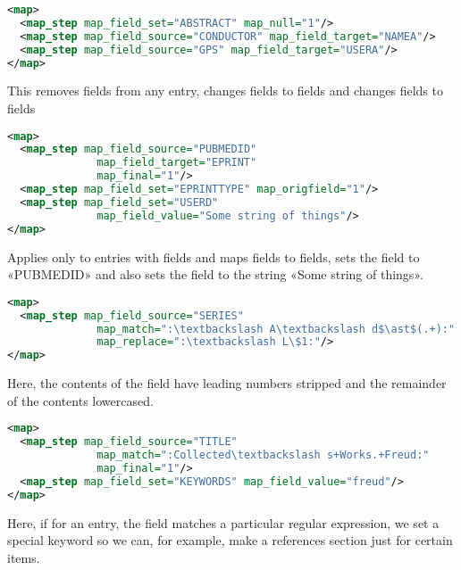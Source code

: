 \documentclass{ltxdockit}
\begin{document}
\begin{lstlisting}[language=xml,escapechar=:,mathescape=true]
<map>
  <map_step map_field_set="ABSTRACT" map_null="1"/>
  <map_step map_field_source="CONDUCTOR" map_field_target="NAMEA"/>
  <map_step map_field_source="GPS" map_field_target="USERA"/>
</map>
\end{lstlisting}

\noindent This removes  fields from any entry, changes
 fields to  fields and changes 
fields to  fields

\begin{lstlisting}[language=xml,escapechar=:,mathescape=true]
<map>
  <map_step map_field_source="PUBMEDID"
              map_field_target="EPRINT"
              map_final="1"/>
  <map_step map_field_set="EPRINTTYPE" map_origfield="1"/>
  <map_step map_field_set="USERD"
              map_field_value="Some string of things"/>
</map>
\end{lstlisting}

\noindent Applies only to entries with  fields and maps
 fields to  fields, sets the 
field to «PUBMEDID» and also sets the  field to the string
«Some string of things».

\begin{lstlisting}[language=xml,escapechar=:,mathescape=true]
<map>
  <map_step map_field_source="SERIES"
              map_match=":\textbackslash A\textbackslash d$\ast$(.+):"
              map_replace=":\textbackslash L\$1:"/>
</map>
\end{lstlisting}

\noindent Here, the contents of the 
field have leading numbers stripped and the remainder of the contents
lowercased.

\begin{lstlisting}[language=xml,escapechar=:,mathescape=true]
<map>
  <map_step map_field_source="TITLE"
              map_match=":Collected\textbackslash s+Works.+Freud:"
              map_final="1"/>
  <map_step map_field_set="KEYWORDS" map_field_value="freud"/>
</map>
\end{lstlisting}

\noindent Here, if for an entry, the  field matches a
particular regular expression, we set a special keyword so we can, for
example, make a references section just for certain items.
\end{document}
